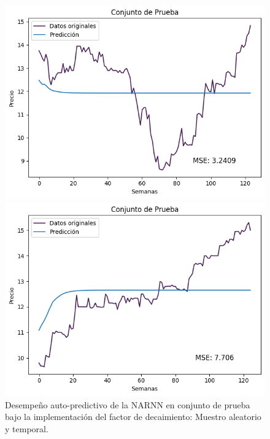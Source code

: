 \begin{figure}[h]
    \begin{minipage}{0.5\textwidth}
        \centering
        \includegraphics[width=\linewidth]{Figuras/proceso_de_entrenamiento/grafs_c_prueba/muestreo_aleatorio/NARNN/auto_predictiva/NARNN_v2.png}
    \end{minipage}
    \begin{minipage}{0.5\textwidth}
        \centering
        \includegraphics[width=\linewidth]{Figuras/proceso_de_entrenamiento/grafs_c_prueba/NARNN/auto_predictiva/NARNN_v2.png}
    \end{minipage}
    \caption{Desempeño auto-predictivo de la NARNN en conjunto de prueba bajo la implementación del factor de decaimiento: Muestro aleatorio y temporal.} 
    \label{fig:c_prueba_NARNN_autopred_v2}
\end{figure}


